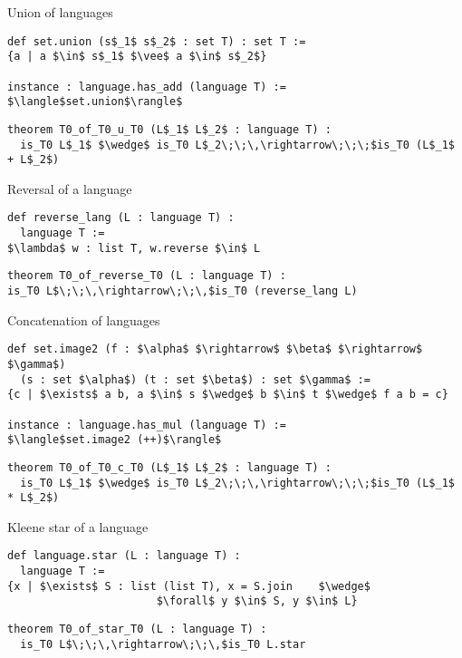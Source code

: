 \documentclass{beamer}
\begin{document}
	\begin{frame}[fragile]{Union of languages}
\begin{lstlisting}
def set.union (s$_1$ s$_2$ : set T) : set T :=
{a | a $\in$ s$_1$ $\vee$ a $\in$ s$_2$}

instance : language.has_add (language T) :=
$\langle$set.union$\rangle$
\end{lstlisting}
\pause
\begin{lstlisting}
theorem T0_of_T0_u_T0 (L$_1$ L$_2$ : language T) :
  is_T0 L$_1$ $\wedge$ is_T0 L$_2\;\;\,\rightarrow\;\;\;$is_T0 (L$_1$ + L$_2$)
\end{lstlisting}
	\end{frame}
	
	\begin{frame}[fragile]{Reversal of a language}
\begin{lstlisting}
def reverse_lang (L : language T) :
  language T :=
$\lambda$ w : list T, w.reverse $\in$ L
\end{lstlisting}
\pause
\begin{lstlisting}
theorem T0_of_reverse_T0 (L : language T) :
is_T0 L$\;\;\,\rightarrow\;\;\,$is_T0 (reverse_lang L)
\end{lstlisting}
	\end{frame}
	
	\begin{frame}[fragile]{Concatenation of languages}
\begin{lstlisting}
def set.image2 (f : $\alpha$ $\rightarrow$ $\beta$ $\rightarrow$ $\gamma$)
  (s : set $\alpha$) (t : set $\beta$) : set $\gamma$ :=
{c | $\exists$ a b, a $\in$ s $\wedge$ b $\in$ t $\wedge$ f a b = c}

instance : language.has_mul (language T) :=
$\langle$set.image2 (++)$\rangle$
\end{lstlisting}
\pause
\begin{lstlisting}
theorem T0_of_T0_c_T0 (L$_1$ L$_2$ : language T) :
  is_T0 L$_1$ $\wedge$ is_T0 L$_2\;\;\,\rightarrow\;\;\;$is_T0 (L$_1$ * L$_2$)
\end{lstlisting}
	\end{frame}
	
	\begin{frame}[fragile]{Kleene star of a language}
\begin{lstlisting}
def language.star (L : language T) :
  language T :=
{x | $\exists$ S : list (list T), x = S.join    $\wedge$
                       $\forall$ y $\in$ S, y $\in$ L}
\end{lstlisting}
\pause
\begin{lstlisting}
theorem T0_of_star_T0 (L : language T) :
  is_T0 L$\;\;\,\rightarrow\;\;\,$is_T0 L.star
\end{lstlisting}
	\end{frame}
	
\end{document}
